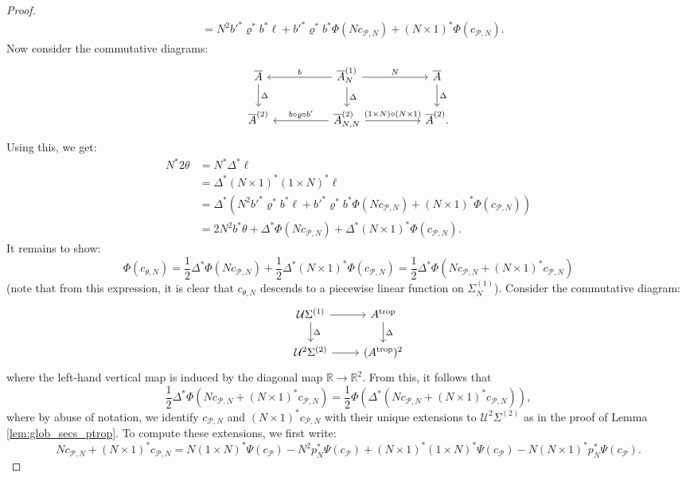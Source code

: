 \documentclass[11pt]{article}
\newcommand{\trop}{\mathrm{trop}}
\newcommand{\barA}{\overline{A}}
\newcommand{\tropA}{{A^{\trop}}}
\theoremstyle{definition}
\begin{document}
\begin{proof}
\begin{align*}
												&=N^{2}{b'}^{\ast}\varrho^{\ast}b^{\ast}\ell+{b'}^{\ast}\varrho^{\ast}b^{\ast}\Phi(Nc_{\mathcal P,N})+(N\times 1)^{\ast}\Phi(c_{\mathcal P,N}).
	\end{align*}
	Now consider the commutative diagrams:
	$$\begin{tikzcd}[column sep=5em]
		\barA\arrow[d,"\Delta"]&\arrow[l,swap,"b"]\barA_{N}^{(1)}\arrow[d,"\Delta"]\arrow[r,"N"]&\barA\arrow[d,"\Delta"]\\
		\barA^{(2)}&\arrow[l,swap,"b\circ \varrho\circ b'"]\barA_{N,N}^{(2)}\arrow[r,"(1\times N)\circ (N\times 1)"]&\barA^{(2)}.
	\end{tikzcd}$$
	Using this, we get:
	\begin{align*}
		N^{\ast}2\theta&=N^{\ast}\Delta^{\ast}\ell\\
					  &=\Delta^{\ast}(N\times 1)^{\ast}(1\times N)^{\ast}\ell\\
					  &=\Delta^{\ast}\left(N^{2}{b'}^{\ast}\varrho^{\ast}b^{\ast}\ell+{b'}^{\ast}\varrho^{\ast}b^{\ast}\Phi(Nc_{\mathcal P,N})+(N\times 1)^{\ast}\Phi(c_{\mathcal P,N})\right)\\
					  &=2N^{2}b^*\theta+\Delta^{\ast}\Phi(Nc_{\mathcal P,N})+\Delta^{\ast}(N\times 1)^{\ast}\Phi(c_{\mathcal P,N}).
	\end{align*}
	It remains to show:
	$$\Phi(c_{\theta,N})=\frac{1}{2}\Delta^{\ast}\Phi(Nc_{\mathcal P,N})+\frac{1}{2}\Delta^{\ast}(N\times 1)^{\ast}\Phi(c_{\mathcal P,N})=\frac{1}{2}\Delta^{\ast}\Phi(Nc_{\mathcal P,N}+(N\times 1)^{\ast}c_{\mathcal P,N})$$
	(note that from this expression, it is clear that $c_{\theta,N}$ descends to a piecewise linear function on $\Sigma_N^{(1)}$).
	Consider the commutative diagram:
	$$\begin{tikzcd}
		\mathcal U\Sigma^{(1)}\arrow[d,"\Delta"]\arrow[r]&\tropA\arrow[d,"\Delta"]\\
		\mathcal U^2\Sigma^{(2)}\arrow[r]&(\tropA)^{2}
	\end{tikzcd}$$
	where the left-hand vertical map is induced by the diagonal map $\mathbb{R}\to \mathbb{R}^{2}$.
	From this, it follows that
	$$\frac{1}{2}\Delta^{\ast}\Phi(Nc_{\mathcal P,N}+(N\times 1)^{\ast}c_{\mathcal P,N})=\frac{1}{2}\Phi(\Delta^{\ast}(Nc_{\mathcal P,N}+(N\times 1)^{\ast}c_{\mathcal P,N})),$$
	where by abuse of notation, we identify $c_{\mathcal P,N}$ and $(N\times 1)^{\ast}c_{\mathcal P,N}$ with their unique extensions to $\mathcal U^2\Sigma^{(2)}$
	as in the proof of Lemma \ref{lem:glob_secs_ptrop}. To compute these extensions, we first write:
	$$Nc_{\mathcal P,N}+(N\times 1)^{\ast}c_{\mathcal P,N}=N(1\times N)^{\ast}\Psi(c_{\mathcal P})-N^{2}p_N^{\ast}\Psi(c_{\mathcal P})+(N\times 1)^{\ast}(1\times N)^{\ast}\Psi(c_{\mathcal P})-N(N\times 1)^{\ast}p_N^{\ast}\Psi(c_{\mathcal P}).$$

\end{proof}
\end{document}
